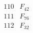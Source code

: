 \documentclass{article}
\begin{document}
{$$\begin{array}{|r|*{7}{r|}}
\\
\hline
110 
 & F_{42} &
 & 
 & 
 & 
 & 
 & 
\\
\hline
111 
 & F_{76} &
 & 
 & 
 & 
 & 
 & 
\\
\hline
112 
 & F_{32} &
 & 
 & 
 & 

\end{array}$$}
\end{document}
